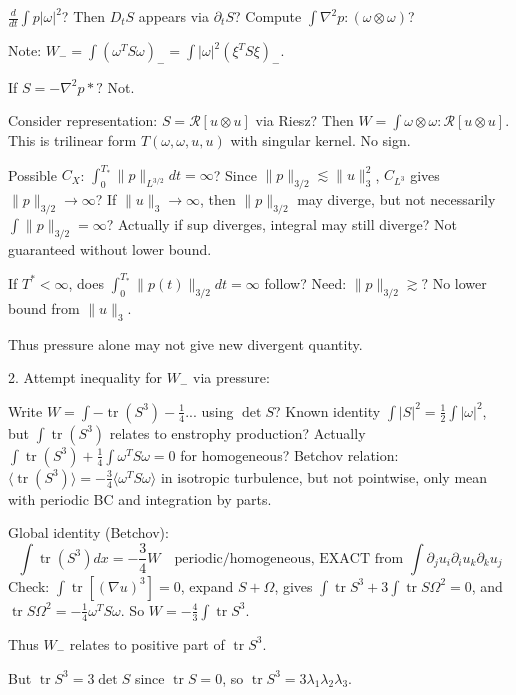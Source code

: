 \documentclass[11pt]{article}
\begin{document}
$\frac{d}{dt}\int p|\omega|^2$? Then $D_t S$ appears via $\partial_t S$? Compute $\int \nabla^2 p : (\omega\otimes\omega)$?

Note: $W_- = \int (\omega^T S\omega)_- = \int |\omega|^2 (\xi^T S\xi)_-$.

If $S = -\nabla^2 p*? $ Not.

Consider representation: $S = \mathcal{R}[u\otimes u]$ via Riesz? Then $W = \int \omega\otimes\omega : \mathcal{R}[u\otimes u]$. This is trilinear form $T(\omega,\omega,u,u)$ with singular kernel. No sign.

Possible $C_X$: $\int_0^{T_*} \|p\|_{L^{3/2}} dt = \infty$? Since $\|p\|_{3/2}\lesssim\|u\|_3^2$, $C_{L^3}$ gives $\|p\|_{3/2}\to\infty$? If $\|u\|_3\to\infty$, then $\|p\|_{3/2}$ may diverge, but not necessarily $\int\|p\|_{3/2}=\infty$? Actually if sup diverges, integral may still diverge? Not guaranteed without lower bound.

If $T^*<\infty$, does $\int_0^{T_*}\|p(t)\|_{3/2} dt =\infty$ follow? Need: $\|p\|_{3/2}\gtrsim?$ No lower bound from $\|u\|_3$.

Thus pressure alone may not give new divergent quantity.

2. Attempt inequality for $W_-$ via pressure:

Write $W = \int -\operatorname{tr}(S^3) - \frac14...$ using $\det S$? Known identity $\int |S|^2 = \frac12\int|\omega|^2$, but $\int \operatorname{tr}(S^3)$ relates to enstrophy production? Actually $\int \operatorname{tr}(S^3)+\frac14\int\omega^T S\omega =0$ for homogeneous? Betchov relation: $\langle\operatorname{tr}(S^3)\rangle = -\frac34\langle\omega^T S\omega\rangle$ in isotropic turbulence, but not pointwise, only mean with periodic BC and integration by parts.

Global identity (Betchov):
\begin{equation*}
\boxed{\int \operatorname{tr}(S^3) dx = -\frac34 W \quad\text{periodic/homogeneous, EXACT from }\int\partial_j u_i\partial_i u_k\partial_k u_j}
\end{equation*}
Check: $\int \operatorname{tr}[(\nabla u)^3]=0$, expand $S+\Omega$, gives $\int \operatorname{tr}S^3 +3\int \operatorname{tr} S\Omega^2 =0$, and $\operatorname{tr}S\Omega^2 = -\frac14\omega^T S\omega$. So $W = -\frac43\int\operatorname{tr}S^3$.

Thus $W_- $ relates to positive part of $\operatorname{tr}S^3$.

But $\operatorname{tr}S^3 = 3\det S$ since $\operatorname{tr}S=0$, so $\operatorname{tr}S^3=3\lambda_1\lambda_2\lambda_3$.
\end{document}
